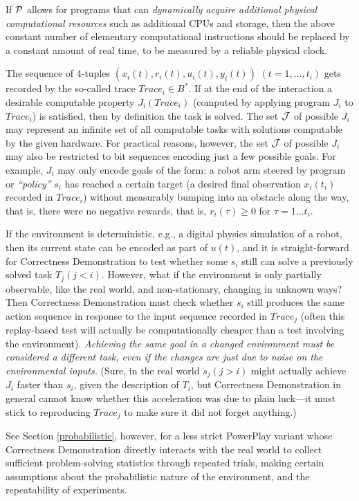 \documentclass{article}
\begin{document}
If $\cal P$ allows for programs that can {\em dynamically acquire additional
physical computational resources} such as additional CPUs and storage,
then the above constant number of elementary computational instructions
should be replaced by a constant amount of real time, to be measured by a reliable physical clock.

The sequence of 4-tuples $(x_i(t),r_i(t),u_i(t),y_i(t))$ $(t=1,\ldots,t_i)$
gets  recorded by the so-called trace $Trace_i \in B^*$.
If at the end of the interaction a desirable computable property $J_i (Trace_i)$  (computed by applying
program $J_i$ to  $Trace_i$)  is satisfied, then by definition the task is solved.
The set  $\cal J$ of  possible $J_i$ may represent an infinite set of all computable tasks with solutions computable
by the given hardware.
For practical reasons, however,
the set  $\cal J$ of  possible $J_i$ may also be restricted to bit sequences encoding just a few possible goals.
For example,  $J_i$ may only encode goals of the form:
a robot arm steered by program or {\em``policy''} $s_i$ has reached a certain target (a desired final observation $x_i(t_i)$ 
recorded in $Trace_i$) 
without measurably bumping into an obstacle along the way, that is, there were no negative rewards, that is, 
$  r_i(\tau) \geq 0$ for $\tau=1 \ldots t_i$.

If the environment is deterministic, e.g., a digital physics simulation of a robot, 
then its current state can be encoded as part of $u(t)$,
and it is straight-forward for {\sc Correctness Demonstration}
to test whether some $s_i$ still can solve a previously solved task $T_j (j<i)$.
However, what 
if the environment  is only partially observable, like the real world, and non-stationary, 
changing in unknown ways?
Then {\sc Correctness Demonstration} must check whether $s_i$ still produces the same action sequence in response to
the input sequence recorded in $Trace_j$ (often this replay-based test will actually be computationally cheaper than
a test involving the environment). 
{\em Achieving the same goal in a changed environment  must be considered a different task,
even if the changes are just due to noise on the environmental inputs.}
(Sure, in the real world $s_j (j>i)$ might actually 
achieve $J_i$ faster than $s_i$, given the description of $T_i$, but   {\sc Correctness Demonstration} in
general cannot know whether this acceleration was due to plain luck---it must stick to reproducing $Trace_j$
to make sure it did not forget anything.)

See Section \ref{probabilistic}, however, for a less strict {\sc PowerPlay} variant whose {\sc Correctness Demonstration} directly interacts with the real world to collect sufficient problem-solving statistics through repeated trials, making certain
assumptions about the probabilistic nature of the environment, and the repeatability of  experiments.
\end{document}
